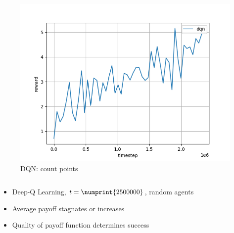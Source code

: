 \begin{frame}
\begin{columns}[t]
\begin{column}{.5\textwidth}
\begin{figure}
\includegraphics[height=.5\textheight]{dqn-specific-payoff.png}
\caption{DQN: count points}
\end{figure}
\end{column}

\end{columns}

\begin{itemize}
\item Deep-Q Learning, $t = \numprint{2500000}$, random agents
\item Average payoff stagnates or increases
\item Quality of payoff function determines success
\end{itemize}
\end{frame}


